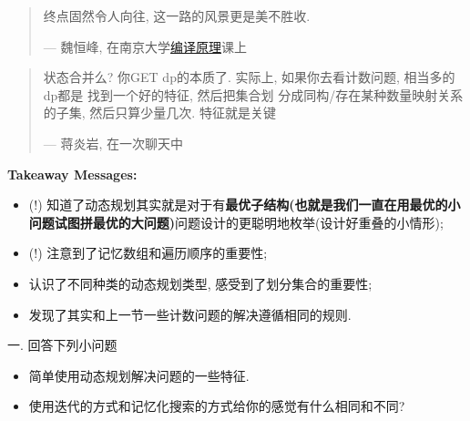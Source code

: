 \begin{quote}
    终点固然令人向往, 这一路的风景更是美不胜收. 

    \hfill --- 魏恒峰, 在南京大学\href{https://www.bilibili.com/video/BV1K24y1u7eA}{编译原理}课上
\end{quote}

\begin{quote}
    状态合并么? 你GET dp的本质了. 实际上, 如果你去看计数问题, 相当多的dp都是
    找到一个好的特征, 然后把集合划
    分成同构/存在某种数量映射关系的子集, 然后只算少量几次. 特征就是关键

    \hfill --- 蒋炎岩, 在一次聊天中
\end{quote}

\textbf{Takeaway Messages: }
\begin{itemize}
    \item (!) 知道了动态规划其实就是对于有\textbf{最优子结构(也就是我们一直在用最优的小问题试图拼最优的大问题)}问题设计的更聪明地枚举(设计好重叠的小情形);
    \item (!) 注意到了记忆数组和遍历顺序的重要性;
    \item 认识了不同种类的动态规划类型, 感受到了划分集合的重要性;
    \item 发现了其实和上一节一些计数问题的解决遵循相同的规则.
\end{itemize}


一. 回答下列小问题
\begin{itemize}[noitemsep]
    \item 简单使用动态规划解决问题的一些特征. 
    \item 使用迭代的方式和记忆化搜索的方式给你的感觉有什么相同和不同?
\end{itemize}